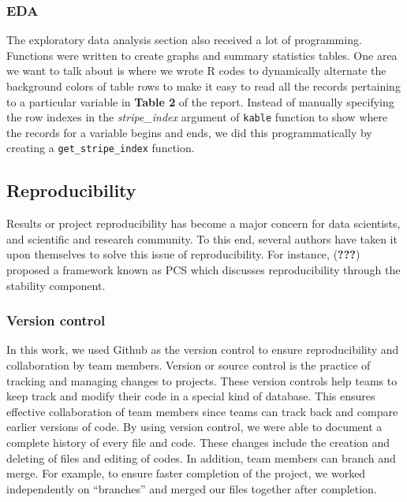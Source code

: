 \documentclass[
  10pt,
]{article}
\begin{document}
\hypertarget{eda}{%
\subsubsection{EDA}\label{eda}}

The exploratory data analysis section also received a lot of programming. Functions were written to create graphs and summary statistics tables. One area we want to talk about is where we wrote R codes to dynamically alternate the background colors of table rows to make it easy to read all the records pertaining to a particular variable in \textbf{Table 2} of the report. Instead of manually specifying the row indexes in the \emph{stripe\_index} argument of \texttt{kable} function to show where the records for a variable begins and ends, we did this programmatically by creating a \texttt{get\_stripe\_index} function.

\hypertarget{reproducibility}{%
\subsection{Reproducibility}\label{reproducibility}}

Results or project reproducibility has become a major concern for data scientists, and scientific and research community. To this end, several authors have taken it upon themselves to solve this issue of reproducibility. For instance, ({\textbf{???}}) proposed a framework known as PCS which discusses reproducibility through the stability component.

\hypertarget{version-control}{%
\subsubsection{Version control}\label{version-control}}

In this work, we used Github as the version control to ensure reproducibility and collaboration by team members. Version or source control is the practice of tracking and managing changes to projects. These version controls help teams to keep track and modify their code in a special kind of database. This ensures effective collaboration of team members since teams can track back and compare earlier versions of code. By using version control, we were able to document a complete history of every file and code. These changes include the creation and deleting of files and editing of codes. In addition, team members can branch and merge. For example, to ensure faster completion of the project, we worked independently on ``branches'' and merged our files together after completion.
\end{document}
